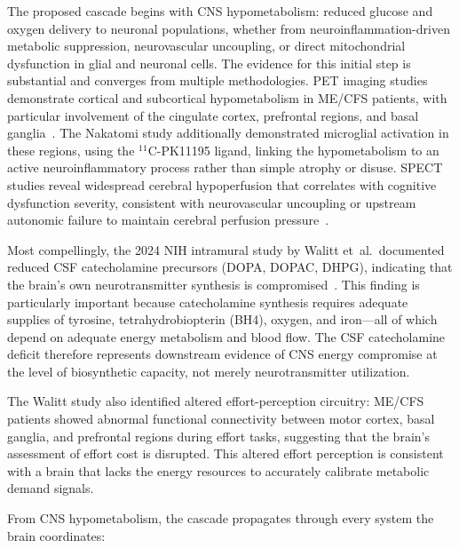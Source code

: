 The proposed cascade begins with CNS hypometabolism: reduced glucose and oxygen delivery to neuronal populations, whether from neuroinflammation-driven metabolic suppression, neurovascular uncoupling, or direct mitochondrial dysfunction in glial and neuronal cells. The evidence for this initial step is substantial and converges from multiple methodologies. PET imaging studies demonstrate cortical and subcortical hypometabolism in ME/CFS patients, with particular involvement of the cingulate cortex, prefrontal regions, and basal ganglia~\cite{Nakatomi2014neuroinflammation}. The Nakatomi study additionally demonstrated microglial activation in these regions, using the $^{11}$C-PK11195 ligand, linking the hypometabolism to an active neuroinflammatory process rather than simple atrophy or disuse. SPECT studies reveal widespread cerebral hypoperfusion that correlates with cognitive dysfunction severity, consistent with neurovascular uncoupling or upstream autonomic failure to maintain cerebral perfusion pressure~\cite{Barnden2011brainstem}.

Most compellingly, the 2024 NIH intramural study by Walitt et~al.\ documented reduced CSF catecholamine precursors (DOPA, DOPAC, DHPG), indicating that the brain's own neurotransmitter synthesis is compromised~\cite{Walitt2024NIH}. This finding is particularly important because catecholamine synthesis requires adequate supplies of tyrosine, tetrahydrobiopterin (BH4), oxygen, and iron---all of which depend on adequate energy metabolism and blood flow. The CSF catecholamine deficit therefore represents downstream evidence of CNS energy compromise at the level of biosynthetic capacity, not merely neurotransmitter utilization.

The Walitt study also identified altered effort-perception circuitry: ME/CFS patients showed abnormal functional connectivity between motor cortex, basal ganglia, and prefrontal regions during effort tasks, suggesting that the brain's assessment of effort cost is disrupted. This altered effort perception is consistent with a brain that lacks the energy resources to accurately calibrate metabolic demand signals.

From CNS hypometabolism, the cascade propagates through every system the brain coordinates:

